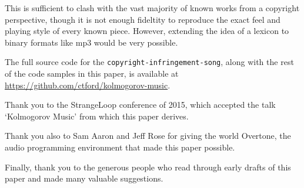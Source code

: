 \documentclass[numbers]{sigplanconf}
\begin{document}
This is sufficient to clash with the vast majority of known works from a copyright perspective, though
it is not enough fideltity to reproduce the exact feel and playing style of every known piece. However, extending the idea of
a lexicon to binary formats like mp3 would be very possible.

The full source code for the \verb|copyright-infringement-song|, along with the rest of the code samples in this paper, is
available at \url{https://github.com/ctford/kolmogorov-music}.

\acks

Thank you to the StrangeLoop conference of 2015, which accepted the talk `Kolmogorov Music' from which this paper derives.

Thank you also to Sam Aaron and Jeff Rose for giving the world Overtone\cite{Overtone}, the audio programming environment
that made this paper possible.

Finally, thank you to the generous people who read through early drafts of this paper and made many valuable suggestions.



\end{document}
